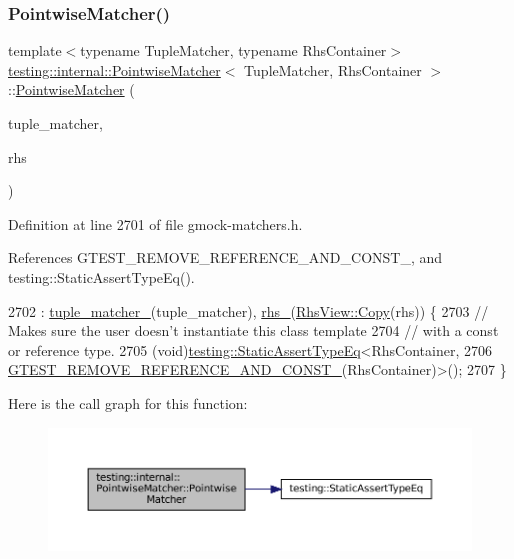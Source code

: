 \subsubsection{\texorpdfstring{Pointwise\+Matcher()}{PointwiseMatcher()}}
{\footnotesize\ttfamily template$<$typename Tuple\+Matcher, typename Rhs\+Container$>$ \\
\hyperlink{classtesting_1_1internal_1_1PointwiseMatcher}{testing\+::internal\+::\+Pointwise\+Matcher}$<$ Tuple\+Matcher, Rhs\+Container $>$\+::\hyperlink{classtesting_1_1internal_1_1PointwiseMatcher}{Pointwise\+Matcher} (\begin{DoxyParamCaption}\item[{const Tuple\+Matcher \&}]{tuple\+\_\+matcher,  }\item[{const Rhs\+Container \&}]{rhs }\end{DoxyParamCaption})\hspace{0.3cm}{\ttfamily [inline]}}



Definition at line 2701 of file gmock-\/matchers.\+h.



References G\+T\+E\+S\+T\+\_\+\+R\+E\+M\+O\+V\+E\+\_\+\+R\+E\+F\+E\+R\+E\+N\+C\+E\+\_\+\+A\+N\+D\+\_\+\+C\+O\+N\+S\+T\+\_\+, and testing\+::\+Static\+Assert\+Type\+Eq().


\begin{DoxyCode}
2702       : \hyperlink{classtesting_1_1internal_1_1PointwiseMatcher_a88ff006de49679fa44b438bfa1f6d153}{tuple\_matcher\_}(tuple\_matcher), \hyperlink{classtesting_1_1internal_1_1PointwiseMatcher_a99dc64b7cd3d5f78742d8a3ed2c4793c}{rhs\_}(\hyperlink{classtesting_1_1internal_1_1StlContainerView_a441123838221f1284873f66ed968f279}{RhsView::Copy}(rhs)) \{
2703     \textcolor{comment}{// Makes sure the user doesn't instantiate this class template}
2704     \textcolor{comment}{// with a const or reference type.}
2705     (void)\hyperlink{namespacetesting_a661e70fc6afeb5c085eed3716aa45059}{testing::StaticAssertTypeEq}<RhsContainer,
2706         \hyperlink{gtest-internal_8h_a874567b176266188fabfffb8393267ce}{GTEST\_REMOVE\_REFERENCE\_AND\_CONST\_}(RhsContainer)>();
2707   \}
\end{DoxyCode}
Here is the call graph for this function\+:
\nopagebreak
\begin{figure}[H]
\begin{center}
\leavevmode
\includegraphics[width=350pt]{classtesting_1_1internal_1_1PointwiseMatcher_aa6e63218a93062d5055428462417821f_cgraph}
\end{center}
\end{figure}


